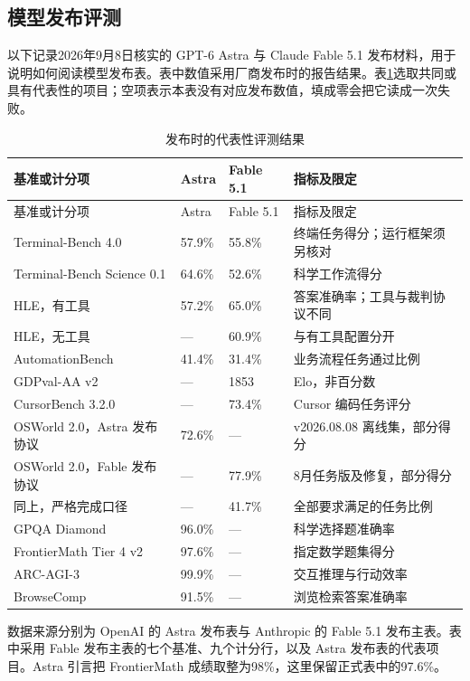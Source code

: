 \documentclass[../textbook.tex]{subfiles}
\begin{document}
\subsection{模型发布评测}
\label{sec:eval-release-benchmarks}
以下记录2026年9月8日核实的 GPT-6 Astra 与 Claude Fable 5.1 发布材料，用于说明如何阅读模型发布表。表中数值采用厂商发布时的报告结果。表\ref{tab:evaluation-release-scores}选取共同或具有代表性的项目；空项表示本表没有对应发布数值，填成零会把它读成一次失败。

\begin{longtable}{@{}p{.38\linewidth}p{.16\linewidth}p{.16\linewidth}p{}@{}}
\caption{发布时的代表性评测结果}\label{tab:evaluation-release-scores}\\
\toprule 基准或计分项 & Astra & Fable 5.1 & 指标及限定\\\midrule
\endfirsthead
\toprule 基准或计分项 & Astra & Fable 5.1 & 指标及限定\\\midrule
\endhead
Terminal-Bench 4.0 & 57.9\% & 55.8\% & 终端任务得分；运行框架须另核对\\
Terminal-Bench Science 0.1 & 64.6\% & 52.6\% & 科学工作流得分\\
HLE，有工具 & 57.2\% & 65.0\% & 答案准确率；工具与裁判协议不同\\
HLE，无工具 & — & 60.9\% & 与有工具配置分开\\
AutomationBench & 41.4\% & 31.4\% & 业务流程任务通过比例\\
GDPval-AA v2 & — & 1853 & Elo，非百分数\\
CursorBench 3.2.0 & — & 73.4\% & Cursor 编码任务评分\\
OSWorld 2.0，Astra 发布协议 & 72.6\% & — & v2026.08.08 离线集，部分得分\\
OSWorld 2.0，Fable 发布协议 & — & 77.9\% & 8月任务版及修复，部分得分\\
同上，严格完成口径 & — & 41.7\% & 全部要求满足的任务比例\\
GPQA Diamond & 96.0\% & — & 科学选择题准确率\\
FrontierMath Tier 4 v2 & 97.6\% & — & 指定数学题集得分\\
ARC-AGI-3 & 99.9\% & — & 交互推理与行动效率\\
BrowseComp & 91.5\% & — & 浏览检索答案准确率\\
\bottomrule
\end{longtable}
数据来源分别为 OpenAI 的 Astra 发布表与 Anthropic 的 Fable 5.1 发布主表\cite{openai2026astralaunch,anthropic2026fable51launch}。表中采用 Fable 发布主表的七个基准、九个计分行，以及 Astra 发布表的代表项目。Astra 引言把 FrontierMath 成绩取整为98\%，这里保留正式表中的97.6\%。
\end{document}
